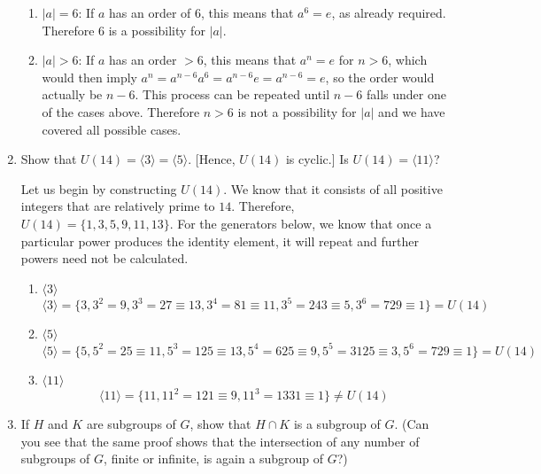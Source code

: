 \documentclass{article}
\begin{document}
\begin{enumerate}
\begin{enumerate}
        \item $|a| = 6$: If $a$ has an order of $6$, this means that $a^6 = e$, as already required. Therefore $6$ is a possibility for $|a|$.
        \item $|a| > 6$: If $a$ has an order $> 6$, this means that $a^n = e$ for $n > 6$, which would then imply $a^n = a^{n-6}a^6 = a^{n-6}e = a^{n-6} = e$, so the order would actually be $n-6$. This process can be repeated until $n-6$ falls under one of the cases above. Therefore $n > 6$ is not a possibility for $|a|$ and we have covered all possible cases.
    \end{enumerate}
    \item Show that $U(14) = \langle3\rangle = \langle5\rangle$. [Hence, $U(14)$ is cyclic.] Is $U(14) = \langle11\rangle$?
    \begin{flushleft}
    Let us begin by constructing $U(14)$. We know that it consists of all positive integers that are relatively prime to $14$. Therefore, $U(14) = \{1, 3, 5, 9, 11, 13\}$. For the generators below, we know that once a particular power produces the identity element, it will repeat and further powers need not be calculated.
    \begin{enumerate}
        \item $\langle3\rangle$
        $$\langle3\rangle = \{3, 3^2=9, 3^3=27\equiv13, 3^4=81\equiv11, 3^5=243\equiv5, 3^6=729\equiv1\} = U(14)$$
        \item $\langle5\rangle$
        $$\langle5\rangle = \{5, 5^2=25\equiv11, 5^3=125\equiv13, 5^4=625\equiv9, 5^5=3125\equiv3, 5^6=729\equiv1\} = U(14)$$
        \item $\langle11\rangle$
        $$\langle11\rangle = \{11, 11^2=121\equiv9, 11^3=1331\equiv1\} \not= U(14)$$
    \end{enumerate}
    \end{flushleft}
    \item If $H$ and $K$ are subgroups of $G$, show that $H\cap K$ is a subgroup of $G$. (Can you see that the same proof shows that the intersection of any number of subgroups of $G$, finite or infinite, is again a subgroup of $G$?)
    \begin{flushleft}

\end{flushleft}
\end{enumerate}
\end{document}
